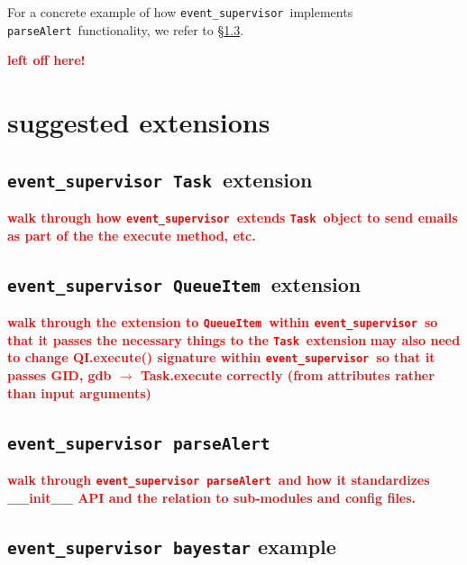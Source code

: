 \documentclass{article}
\newcommand{\FIXME}[1]{\textcolor{red}{\textbf{#1}}}
\newcommand{\parseAlert}{\texttt{parseAlert}~}
\newcommand{\QueueItem}{\texttt{QueueItem}~}
\newcommand{\Task}{\texttt{Task}~}
\newcommand{\eventSupervisor}{\texttt{event\_supervisor}~}
\begin{document}
For a concrete example of how \eventSupervisor implements \parseAlert functionality, we refer to \S\ref{sec: eventSupervisor parseAlert}.


\newpage

\FIXME{left off here!}

\newpage

\section{suggested extensions}
\label{sec: suggested extensions}


\subsection{\eventSupervisor \Task extension}
\label{sec: eventSupervisor Task}

\FIXME{walk through how \eventSupervisor extends \Task object to send emails as part of the the execute method, etc.}


\subsection{\eventSupervisor \QueueItem extension}
\label{sec: eventSupervisor QueueItem}

\FIXME{walk through the extension to \QueueItem within \eventSupervisor so that it passes the necessary things to the \Task extension}
\FIXME{may also need to change QI.execute() signature within \eventSupervisor so that it passes GID, gdb $\rightarrow$ Task.execute correctly (from attributes rather than input arguments)}


\subsection{\eventSupervisor \parseAlert}
\label{sec: eventSupervisor parseAlert}

\FIXME{walk through \eventSupervisor \parseAlert and how it standardizes \_\_init\_\_ API and the relation to sub-modules and config files.}


\subsection{\eventSupervisor \texttt{bayestar} example}
\label{sec: eventSupervisor bayestar}
\end{document}
